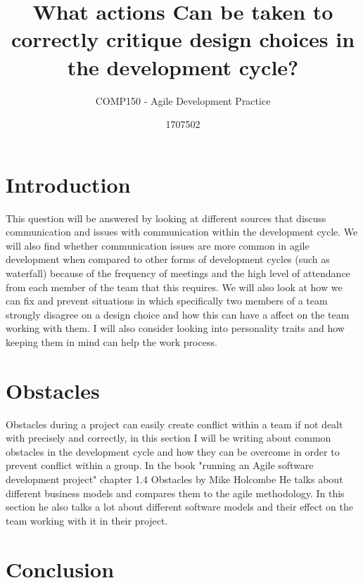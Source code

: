 \documentclass{scrartcl}
\title{What actions Can be taken to correctly critique design choices in the development cycle?}
\subtitle{COMP150 - Agile Development Practice}
\author{1707502}
\begin{document}
\maketitle

\abstract{}

\section{Introduction}

This question will be answered by looking at different sources that discuss communication and issues with communication within the development cycle. We will also find whether communication issues are more common in agile development when compared to other forms of development cycles (such as waterfall) because of the frequency of meetings and the high level of attendance from each member of the team that this requires. We will also look at how we can fix and prevent situations in which specifically two members of a team strongly disagree on a design choice and how this can have a affect on the team working with them. I will also consider looking into personality traits and how keeping them in mind can help the work process.

\section{Obstacles}

Obstacles during a project can easily create conflict within a team if not dealt with precisely and correctly, in this section I will be writing about common obstacles in the development cycle and how they can be overcome in order to prevent conflict within a group. In the book "running an Agile software development project" chapter 1.4 Obstacles by Mike Holcombe \cite{holcombe2008running} He talks about different business models and compares them to the agile methodology. In this section he also talks a lot about different software models and their effect on the team working with it in  their project. 

\section{Conclusion}





\end{document}
